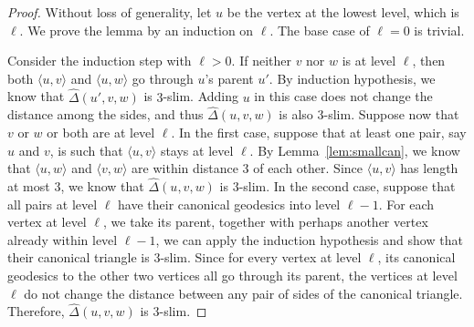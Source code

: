 \documentclass[11pt]{article}
\begin{document}
\begin{proof}
Without loss of generality, let $u$ be the vertex at 
	the lowest level, which is $\ell$.
We prove the lemma by an induction on $\ell$.
The base case of $\ell = 0$ is trivial.

Consider the induction step with $\ell > 0$.
If neither $v$ nor $w$ is at level $\ell$, then 
	both $\langle u, v\rangle$ and $\langle u,w\rangle$ go through
	$u$'s parent $u'$.
By induction hypothesis, we know that $ \hat{\Delta}(u',v,w)$ is
	$3$-slim.
Adding $u$ in this case does not change the distance among the sides, and
	thus $ \hat{\Delta}(u,v,w)$ is also $3$-slim.
Suppose now that $v$ or $w$ or both are at level $\ell$.
In the first case, suppose that at least one pair, say $u$ and $v$, is such that
	$\langle u, v\rangle$ stays at level $\ell$.
By Lemma~\ref{lem:smallcan}, we know that $\langle u, w\rangle$ and
	$\langle v, w\rangle$ are within distance $3$ of each other.
Since $\langle u, v\rangle$ has length at most $3$, we know that
	$ \hat{\Delta}(u,v,w)$ is $3$-slim.
In the second case, suppose that all pairs at level $\ell$ have
	their canonical geodesics into level $\ell -1$.
For each vertex at level $\ell$, we take its parent, together with perhaps
	another vertex already within level $\ell-1$, we can apply the
	induction hypothesis and show that their canonical triangle is
	$3$-slim.
Since for every vertex at level $\ell$, its canonical geodesics
	to the other two vertices all go through its parent, 
	the vertices at level $\ell$ do not change the distance between
	any pair of sides of the canonical triangle.
Therefore, $ \hat{\Delta}(u,v,w)$ is $3$-slim.
\end{proof}


\end{document}
